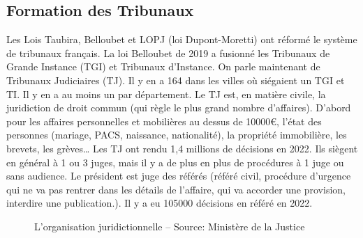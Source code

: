 \documentclass[math]{cours}
\begin{document}
\subsection{Formation des Tribunaux}
	Les Lois Taubira, Belloubet et LOPJ (loi Dupont-Moretti) ont réformé le système de tribunaux français.
	La loi Belloubet de 2019 a fusionné les Tribunaux de Grande Instance (TGI) et Tribunaux d'Instance.
	On parle maintenant de Tribunaux Judiciaires (TJ). Il y en a 164 dans les villes où siégaient un TGI et TI.
	Il y en a au moins un par département.
	Le TJ est, en matière civile, la juridiction de droit commun (qui règle le plus grand nombre d'affaires).
	D'abord pour les affaires personnelles et mobilières au dessus de 10000€, l'état des personnes (mariage, PACS, naissance, nationalité), la propriété immobilière, les brevets, les grèves\ldots
	Les TJ ont rendu 1,4 millions de décisions en 2022.
	Ils siègent en général à 1 ou 3 juges, mais il y a de plus en plus de procédures à 1 juge ou sans audience.
	Le président est juge des référés (référé civil, procédure d'urgence qui ne va pas rentrer dans les détails de l'affaire, qui va accorder une provision, interdire une publication.). Il y a eu 105000 décisions en référé en 2022.
\begin{figure}[h]
	\centering
	\caption{L'organisation juridictionnelle -- Source: Ministère de la Justice}
	\label{fig:orga_juridictionnelle}
\end{figure}
\end{document}
